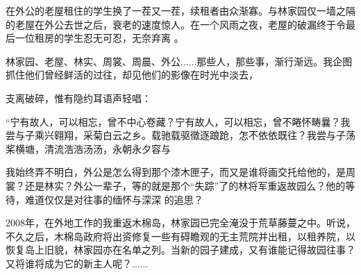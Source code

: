 \documentclass{article}
\begin{document}
在外公的老屋租住的学生换了一茬又一茬，续租者由众渐寡。与林家园仅一墙之隔的老屋在外公去世之后，衰老的速度惊人。在一个风雨之夜，老屋的破漏终于令最后一位租房的学生忍无可忍，无奈弃离
。 

林家园、老屋、林实、周裳、周晨、外公......那些人，那些事，渐行渐远。我企图抓住他们曾经鲜活的过往，却见他们的影像在时光中淡去，
\newpage

支离破碎，惟有隐约耳语声轻唱： 

“宁有故人，可以相忘，曾不中心卷藏？宁有故人，可以相忘，曾不睠怀畴曩？我尝与子乘兴翱翔，采菊白云之乡。载驰载驱徵逐踉跄，怎不依依既往？我尝与子荡桨横塘，清流浩浩汤汤，永朝永夕容与

我始终弄不明白，外公是怎么得到那个漆木匣子，而又是谁将画交托给他的，是周裳？还是林实？外公一辈子，等的就是那个“失踪”了的林将军重返故园么？他的等待，难道仅仅是对往事的缅怀与深深
的追思？ 

2008年，在外地工作的我重返木棉岛，林家园已完全淹没于荒草藤蔓之中。听说，不久之后，木棉岛政府将出资修复一些有碍瞻观的无主荒院并出租，以租养院，以恢复岛上旧貌，林家园亦在名单之列。当新的园子建成，又有谁能记得故园往事？又将谁将成为它的新主人呢？......
\end{document}
